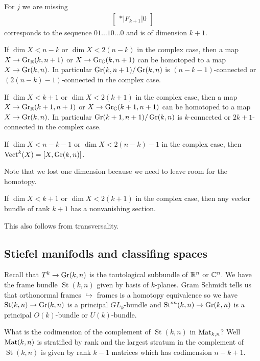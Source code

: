 \documentclass[12pt]{article}
\DeclareMathOperator{\St}{St}
\begin{document}
For $j$ we are missing \begin{align*}
    \begin{bmatrix}
        * \vert F_{k+1} \vert 0
    \end{bmatrix}
\end{align*}
corresponds to the sequence $01\dots10\dots0$ and is of dimension $k+1$.

\begin{corollary}
     If $\dim X < n-k$ or $\dim X < 2(n-k)$ in the complex case, then a map $X \to \operatorname{Gr}_{\mathbb{R}}(k,n+1)$ or $X \to \operatorname{Gr}_{\mathbb{C}}(k,n+1)$ can be homotoped to a map $X \to \operatorname{Gr}(k,n)$. In particular $\operatorname{Gr}(k,n+1)/\operatorname{Gr}(k,n)$ is $(n-k-1)$-connected or $(2(n-k)-1)$-connected in the complex case.

    If $\dim X < k+1$ or $\dim X < 2(k+1)$ in the complex case, then a map $X \to \operatorname{Gr}_{\mathbb{R}}(k+1,n+1)$ or $X \to \operatorname{Gr}_{\mathbb{C}}(k+1,n+1)$ can be homotoped to a map $X \to \operatorname{Gr}(k,n)$. In particular $\operatorname{Gr}(k+1,n+1)/\operatorname{Gr}(k,n)$ is $k$-connected or $2k+1$-connected in the complex case.
\end{corollary}


\begin{corollary}
     If $\dim X < n-k-1$ or $\dim X < 2(n-k)-1$ in the complex case, then $\operatorname{Vect}^k(X) = [X, \operatorname{Gr}(k,n)]$.
\end{corollary}
Note that we lost one dimension because we need to leave room for the homotopy.

\begin{corollary}
    If $\dim X < k+1$ or $\dim X < 2(k+1)$ in the complex case, then any vector bundle of rank $k+1$ has a nonvanishing section. 
\end{corollary}
This also follows from transversality.

\subsection{Stiefel manifodls and classifing spaces}
Recall that $T^k \to \operatorname{Gr}(k,n)$ is the tautological subbundle of $\mathbb{R}^n$ or $\mathbb{C}^n$. We have the frame bundle $\St(k,n)$ given by basis of $k$-planes. Gram Schmidt tells us that orthonormal frames $\hookrightarrow$ frames is a homotopy equivalence so we have $\St(k,n) \to \Gr(k,n)$ is a principal $GL_k$-bundle and $\St^{on}(k,n) \to \Gr(k,n)$ is a principal $O(k)$-bundle or $U(k)$-bundle. 

What is the codimension of the complement of $\St(k,n)$ in $\operatorname{Mat}_{k,n}$? Well $\operatorname{Mat}(k,n)$ is stratified by rank and the largest stratum in the complement of $\St(k,n)$ is given by rank $k-1$ matrices which has codimension $n-k+1$. 
\end{document}

